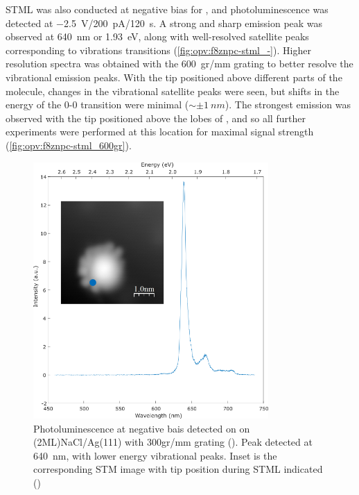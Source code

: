 \ac{STML} was also conducted at negative bias for , and photoluminescence was detected at \SI{-2.5}{V}/\SI{200}{pA}/\SI{120}{s}. A strong and sharp emission peak was observed at \SI{640}{nm} or \SI{1.93}{eV}, along with well-resolved satellite peaks corresponding to vibrations transitions (\autoref{fig:opv:f8znpc-stml_-}). Higher resolution spectra was obtained with the \SI{600}{gr/mm} grating to better resolve the vibrational emission peaks. With the tip positioned above different parts of the molecule, changes in the vibrational satellite peaks were seen, but shifts in the energy of the 0-0 transition were minimal ($\sim \pm \SI{1}{nm}$). The strongest emission was observed with the tip positioned above the lobes of , and so all further experiments were performed at this location for maximal signal strength (\autoref{fig:opv:f8znpc-stml_600gr}).


\begin{figure} [h]
    \centering
           \includegraphics[width=0.8\textwidth]{pictures/f8znpc_-ve_emission_inset300.png}
           
        \caption{Photoluminescence at negative bais detected on  on (2ML)NaCl/Ag(111) with 300gr/mm grating (). Peak detected at \SI{640}{nm}, with lower energy vibrational peaks. Inset is the corresponding STM image with tip position during STML indicated ()}
        \label{fig:opv:f8znpc-stml_-}
    
\end{figure}


